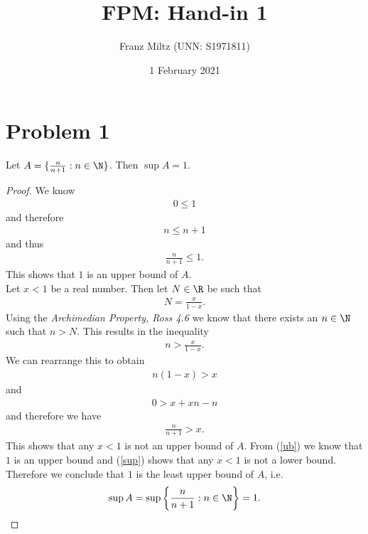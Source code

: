 \documentclass{article}
\begin{document}
\title{FPM: Hand-in 1}
\author{Franz Miltz (UNN: S1971811)}
\date{1 February 2021}
\maketitle

\section*{Problem 1}

\begin{claim*}
   Let $A=\{\frac{n}{n+1}:n\in\N\}$. Then $\sup A = 1$.
\end{claim*}
\begin{proof}
   We know
   \begin{align*}
      0 \leq 1
   \end{align*} 
   and therefore
   \begin{align*}
      n \leq n + 1
   \end{align*}
   and thus
   \begin{align}
      \label{ub}
      \frac{n}{n+1}\leq 1.
   \end{align}
   This shows that $1$ is an upper bound of $A$.\\
   Let $x<1$ be a real number. Then let $N\in\R$ be such that
   \begin{align*}
      N = \frac{x}{1-x}.
   \end{align*}
   Using the \emph{Archimedian Property, Ross 4.6} we know that there exists
   an $n\in\N$ such that $n > N$. This results in the inequality
   \begin{align*}
      n > \frac{x}{1-x}. 
   \end{align*}
   We can rearrange this to obtain 
   \begin{align*}
      n(1-x) > x
   \end{align*}
   and 
   \begin{align*}
      0 > x + xn - n
   \end{align*}
   and therefore we have
   \begin{align}
      \label{sup}
      \frac{n}{n+1} > x.
   \end{align}
   This shows that any $x<1$ is not an upper bound of $A$.
   From (\ref{ub}) we know that $1$ is an upper bound and (\ref{sup}) shows
   that any $x<1$ is not a lower bound. Therefore we conclude that
   $1$ is the least upper bound of $A$, i.e.
   \begin{align*}
      \sup A = \sup\left\{\frac{n}{n+1}:n\in\N\right\} = 1.
   \end{align*}
\end{proof}
\end{document}
